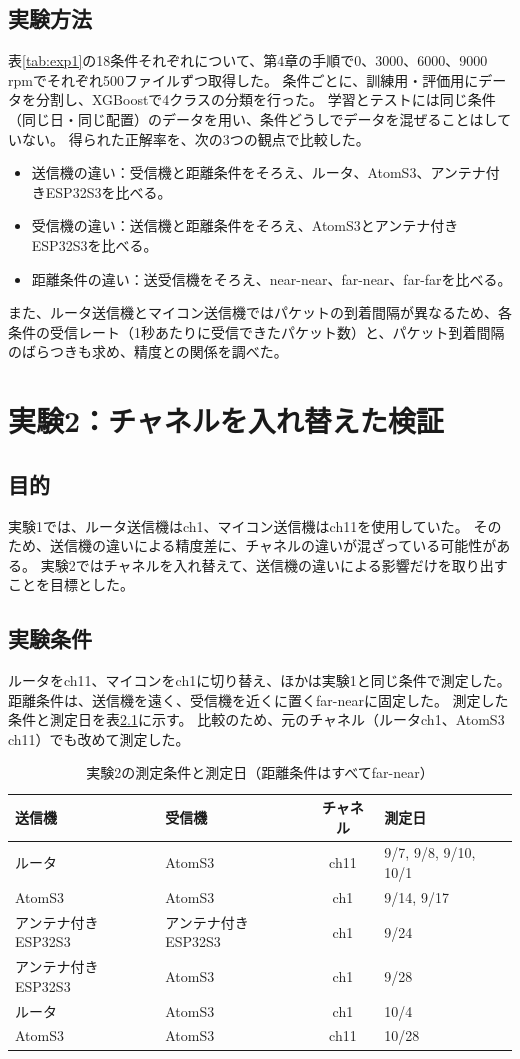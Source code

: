 \documentclass[uplatex, 12pt]{ujbook}
\begin{document}
\section{実験方法}
表\ref{tab:exp1}の18条件それぞれについて、第4章の手順で0、3000、6000、9000\,rpmでそれぞれ500ファイルずつ取得した。
条件ごとに、訓練用・評価用にデータを分割し、XGBoostで4クラスの分類を行った。
学習とテストには同じ条件（同じ日・同じ配置）のデータを用い、条件どうしでデータを混ぜることはしていない。
得られた正解率を、次の3つの観点で比較した。
\begin{itemize}
  \item 送信機の違い：受信機と距離条件をそろえ、ルータ、AtomS3、アンテナ付きESP32S3を比べる。
  \item 受信機の違い：送信機と距離条件をそろえ、AtomS3とアンテナ付きESP32S3を比べる。
  \item 距離条件の違い：送受信機をそろえ、near-near、far-near、far-farを比べる。
\end{itemize}
また、ルータ送信機とマイコン送信機ではパケットの到着間隔が異なるため、各条件の受信レート（1秒あたりに受信できたパケット数）と、パケット到着間隔のばらつきも求め、精度との関係を調べた。

\chapter{実験2：チャネルを入れ替えた検証}
\section{目的}
実験1では、ルータ送信機はch1、マイコン送信機はch11を使用していた。
そのため、送信機の違いによる精度差に、チャネルの違いが混ざっている可能性がある。
実験2ではチャネルを入れ替えて、送信機の違いによる影響だけを取り出すことを目標とした。

\section{実験条件}
ルータをch11、マイコンをch1に切り替え、ほかは実験1と同じ条件で測定した。
距離条件は、送信機を遠く、受信機を近くに置くfar-nearに固定した。
測定した条件と測定日を表\ref{tab:exp2}に示す。
比較のため、元のチャネル（ルータch1、AtomS3 ch11）でも改めて測定した。

\begin{table}[htbp]
  \centering
  \caption{実験2の測定条件と測定日（距離条件はすべてfar-near）}
  \label{tab:exp2}
  \begin{tabular}{l l c l}
    \toprule
    送信機 & 受信機 & チャネル & 測定日 \\
    \midrule
    ルータ & AtomS3 & ch11 & 9/7, 9/8, 9/10, 10/1 \\
    AtomS3 & AtomS3 & ch1 & 9/14, 9/17 \\
    アンテナ付きESP32S3 & アンテナ付きESP32S3 & ch1 & 9/24 \\
    アンテナ付きESP32S3 & AtomS3 & ch1 & 9/28 \\
    \midrule
    ルータ & AtomS3 & ch1 & 10/4 \\
    AtomS3 & AtomS3 & ch11 & 10/28 \\
    \bottomrule
  \end{tabular}
\end{table}
\end{document}
